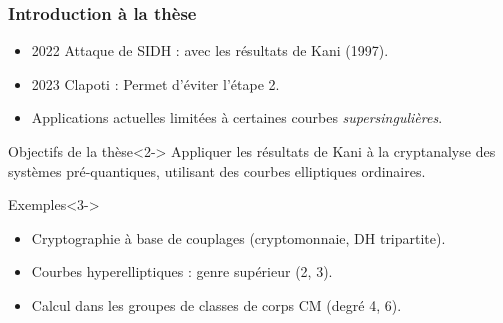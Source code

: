 \documentclass[11pt]{beamer}
\begin{document}
	\begin{frame}
		\frametitle{Introduction à la thèse} 
		\begin{itemize}
			\item 2022 Attaque de SIDH : avec les résultats de Kani (1997).
			\item 2023 Clapoti : Permet d'éviter l'étape 2.
			\item Applications actuelles limitées à certaines courbes \textit{supersingulières}.
		\end{itemize}
		
		\begin{block}{Objectifs de la thèse}<2->
		Appliquer les résultats de Kani à la cryptanalyse des systèmes pré-quantiques, utilisant des courbes elliptiques ordinaires. 
		\end{block}
		
		\begin{block}{Exemples}<3->
			\begin{itemize}
				\item Cryptographie à base de couplages (cryptomonnaie, DH tripartite).
				\item Courbes hyperelliptiques : genre supérieur (2, 3).
				\item Calcul dans les groupes de classes de corps CM (degré 4, 6).
			\end{itemize}
		\end{block}
		
		
		
	\end{frame}
	
	
	
\end{document}
